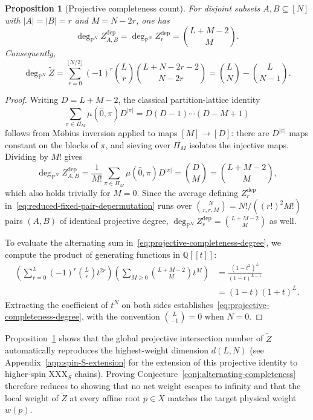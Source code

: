 \documentclass[11pt]{article}
\newtheorem{proposition}{Proposition}[section]
\theoremstyle{definition}
\begin{document}
\begin{proposition}[Projective completeness count]
	\label{prop:projective-completeness}
	For disjoint subsets $A,B\subseteq[N]$ with $|A|=|B|=r$ and $M=N-2r$, one has
	\begin{equation}\label{eq:projective-depermutation-degree}
		\deg_{\mathbb{P}^N}Z^{\mathrm{dep}}_{A,B}
		=\deg_{\mathbb{P}^N}Z^{\mathrm{dep}}_r
		=\binom{L+M-2}{M}.
	\end{equation}
	Consequently,
	\begin{equation}\label{eq:projective-completeness-degree}
		\boxed{
			\deg_{\mathbb{P}^N}\tilde{Z}
			=\sum_{r=0}^{\lfloor N/2\rfloor}(-1)^r\binom{L}{r}
			\binom{L+N-2r-2}{N-2r}
			=\binom{L}{N}-\binom{L}{N-1}.}
	\end{equation}
\end{proposition}

\begin{proof}
	Writing $D=L+M-2$, the classical partition-lattice identity
	\[
	\sum_{\pi\in\Pi_M}\mu(\hat{0},\pi)D^{|\pi|}
	=D(D-1)\cdots(D-M+1)
	\]
	follows from M\"obius inversion applied to maps $[M]\to[D]$:
	there are $D^{|\pi|}$ maps constant on the blocks of $\pi$, and
	sieving over $\Pi_M$ isolates the injective maps. Dividing by $M!$ gives
	\[
	\deg_{\mathbb{P}^N}Z^{\mathrm{dep}}_{A,B}
	=\frac{1}{M!}\sum_{\pi\in\Pi_M}\mu(\hat{0},\pi)D^{|\pi|}
	=\binom{D}{M}=\binom{L+M-2}{M},
	\]
	which also holds trivially for $M=0$. Since the average defining
	$Z^{\mathrm{dep}}_r$ in~\eqref{eq:reduced-fixed-pair-depermutation} runs over $\binom{N}{r,r,M}=N!/((r!)^2 M!)$ pairs $(A,B)$ of identical projective degree, $\deg_{\mathbb{P}^N}Z^{\mathrm{dep}}_r=\binom{L+M-2}{M}$ as well.

	To evaluate the alternating sum in~\eqref{eq:projective-completeness-degree}, we compute the product of generating functions in $\mathbb{Q}[[t]]$:
	\[
	\begin{aligned}
		\left(\sum_{r=0}^L(-1)^r\binom{L}{r} t^{2r}\right)
		\left(\sum_{M\ge 0}\binom{L+M-2}{M}t^M\right)
		&=\frac{(1-t^2)^L}{(1-t)^{L-1}}\\
		&=(1-t)(1+t)^L.
	\end{aligned}
	\]
	Extracting the coefficient of $t^N$ on both sides establishes~\eqref{eq:projective-completeness-degree}, with the convention $\binom{L}{-1}=0$ when $N=0$.
\end{proof}

Proposition~\ref{prop:projective-completeness} shows that the global projective intersection number of $\tilde{Z}$ automatically reproduces the highest-weight dimension $d(L,N)$ (see Appendix~\ref{app:spin-S-extension} for the extension of this projective identity to higher-spin XXX$_S$ chains). Proving Conjecture~\ref{conj:alternating-completeness} therefore reduces to showing that no net weight escapes to infinity and that the local weight of $\tilde{Z}$ at every affine root $p\in X$ matches the target physical weight $w(p)$.
\end{document}
